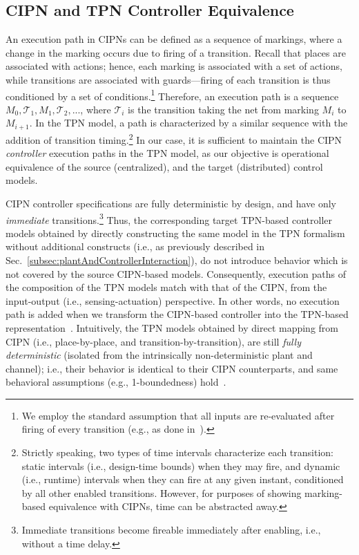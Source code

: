 {\subsection{CIPN and TPN Controller Equivalence}
  An execution path in CIPNs can be defined as a sequence of markings, where a change in the marking occurs due to firing of a transition. Recall that places are associated with actions; hence, each marking is associated with a set of actions, while transitions are associated with guards---firing of each transition is thus conditioned by a set of conditions.\footnote{We employ the standard assumption that all inputs are re-evaluated after firing of every transition (e.g., as done in~\cite{SFCtoTPN}).} Therefore, an execution path is a sequence $M_0,\mathcal{T}_1,M_1,\mathcal{T}_2,...$, where $\mathcal{T}_{i}$ is the transition taking the net from marking $M_i$ to $M_{i+1}$. In the TPN model, a path is characterized by a similar sequence with the addition of transition timing.\footnote{Strictly speaking, two types of time intervals characterize each transition: static intervals (i.e., design-time bounds) when they may fire, and dynamic (i.e., runtime) intervals when they can fire at any given instant, conditioned by all other enabled transitions. However, for purposes of showing marking-based equivalence with CIPNs, time can be abstracted away.} In our case, it is sufficient to maintain the CIPN \emph{controller} execution paths in the TPN model, as our objective is operational equivalence of the source (centralized), and the target (distributed) control models.

{
CIPN controller specifications are fully deterministic by design, and have only \emph{immediate} transitions.\footnote{Immediate transitions become fireable immediately after enabling, i.e., without a time delay.}
Thus, the corresponding target TPN-based controller models obtained by directly constructing the same model in the TPN formalism without additional constructs (i.e., as previously described in Sec.~\ref{subsec:plantAndControllerInteraction}), %
do not introduce behavior which is not covered by the source CIPN-based models. Consequently, execution paths of the composition of the TPN models match with that of the CIPN, from the input-output (i.e., sensing-actuation) perspective. In other words, no execution path is added when we transform the CIPN-based controller into the TPN-based representation~\cite{jakovljevic_tcst19}. Intuitively, the TPN models obtained by direct mapping from CIPN (i.e., place-by-place, and transition-by-transition), are still \emph{fully deterministic} (isolated from the intrinsically non-deterministic plant and channel); i.e., their behavior is identical to their CIPN counterparts, and same behavioral assumptions (e.g., 1-boundedness) hold~\cite{David20101}.
}

}
